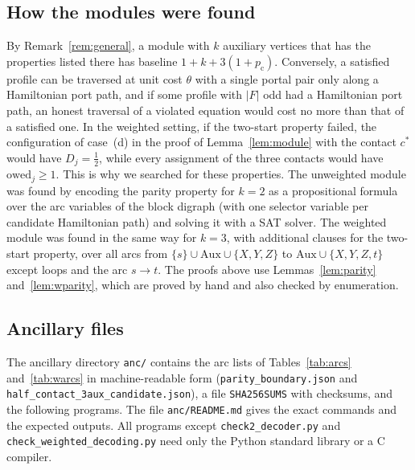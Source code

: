 \documentclass[11pt]{amsart}
\theoremstyle{definition}
\theoremstyle{remark}
\numberwithin{equation}{section}
\newcommand{\owed}{\mathrm{owed}}
\newcommand{\Aux}{\mathrm{Aux}}
\newcommand{\pc}{p_{\mathrm{c}}}
\begin{document}
\subsection{How the modules were found}
By Remark~\ref{rem:general}, a module with $k$ auxiliary vertices that has the properties listed there has baseline $1+k+3(1+\pc)$. Conversely, a satisfied profile can be traversed at unit cost $\theta$ with a single portal pair only along a Hamiltonian port path, and if some profile with $|F|$ odd had a Hamiltonian port path, an honest traversal of a violated equation would cost no more than that of a satisfied one. In the weighted setting, if the two-start property failed, the configuration of case~(d) in the proof of Lemma~\ref{lem:module} with the contact $c^*$ would have $D_j=\frac12$, while every assignment of the three contacts would have $\owed_j\ge1$. This is why we searched for these properties. The unweighted module was found by encoding the parity property for $k=2$ as a propositional formula over the arc variables of the block digraph (with one selector variable per candidate Hamiltonian path) and solving it with a SAT solver. The weighted module was found in the same way for $k=3$, with additional clauses for the two-start property, over all arcs from $\{s\}\cup\Aux\cup\{X,Y,Z\}$ to $\Aux\cup\{X,Y,Z,t\}$ except loops and the arc $s\to t$. The proofs above use Lemmas~\ref{lem:parity} and~\ref{lem:wparity}, which are proved by hand and also checked by enumeration.

\subsection{Ancillary files}
The ancillary directory \texttt{anc/} contains the arc lists of Tables~\ref{tab:arcs} and~\ref{tab:warcs} in machine-readable form (\texttt{parity\_boundary.json} and \texttt{half\_contact\_3aux\_candidate.json}), a file \texttt{SHA256SUMS} with checksums, and the following programs. The file \texttt{anc/README.md} gives the exact commands and the expected outputs. All programs except \texttt{check2\_decoder.py} and \texttt{check\_weighted\_decoding.py} need only the Python standard library or a C compiler.
\end{document}
